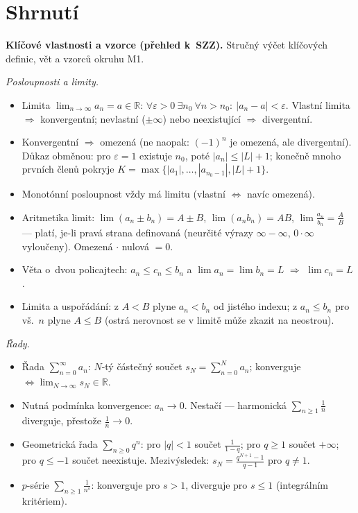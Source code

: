 \documentclass[11pt,a4paper]{article}
\begin{document}
\section*{Shrnutí}

\begin{poznamka}
\textbf{Klíčové vlastnosti a vzorce (přehled k~SZZ).} Stručný výčet klíčových definic, vět a vzorců okruhu M1.

\smallskip
\emph{Posloupnosti a limity.}
\begin{itemize}
  \item Limita $\lim_{n\to\infty}a_n=a\in\mathbb{R}$: $\forall\varepsilon>0\ \exists n_0\ \forall n>n_0:\ |a_n-a|<\varepsilon$. Vlastní limita $\Rightarrow$ konvergentní; nevlastní ($\pm\infty$) nebo neexistující $\Rightarrow$ divergentní.
  \item Konvergentní $\Rightarrow$ omezená (ne naopak: $(-1)^n$ je omezená, ale divergentní). Důkaz obměnou: pro $\varepsilon=1$ existuje $n_0$, poté $|a_n|\le|L|+1$; konečně mnoho prvních členů pokryje $K=\max\{|a_1|,\dots,|a_{n_0-1}|,|L|+1\}$.
  \item Monotónní posloupnost vždy má limitu (vlastní $\iff$ navíc omezená).
  \item Aritmetika limit: $\lim(a_n\pm b_n)=A\pm B$, $\lim(a_n b_n)=AB$, $\lim\tfrac{a_n}{b_n}=\tfrac AB$ --- platí, je-li pravá strana definovaná (neurčité výrazy $\infty-\infty$, $0\cdot\infty$ vyloučeny). Omezená $\cdot$ nulová $= 0$.
  \item Věta o~dvou policajtech: $a_n\le c_n\le b_n$ a $\lim a_n=\lim b_n=L$ $\Rightarrow$ $\lim c_n=L$.
  \item Limita a uspořádání: z $A<B$ plyne $a_n<b_n$ od jistého indexu; z $a_n\le b_n$ pro vš.\ $n$ plyne $A\le B$ (ostrá nerovnost se v limitě může zkazit na neostrou).
\end{itemize}

\smallskip
\emph{Řady.}
\begin{itemize}
  \item Řada $\sum_{n=0}^\infty a_n$: $N$-tý částečný součet $s_N=\sum_{n=0}^N a_n$; konverguje $\iff\lim_{N\to\infty}s_N\in\mathbb{R}$.
  \item Nutná podmínka konvergence: $a_n\to0$. Nestačí --- harmonická $\sum_{n\ge1}\tfrac1n$ diverguje, přestože $\tfrac1n\to0$.
  \item Geometrická řada $\sum_{n\ge0}q^n$: pro $|q|<1$ součet $\tfrac{1}{1-q}$; pro $q\ge1$ součet $+\infty$; pro $q\le-1$ součet neexistuje. Mezivýsledek: $s_N=\tfrac{q^{N+1}-1}{q-1}$ pro $q\neq1$.
  \item $p$-série $\sum_{n\ge1}\tfrac{1}{n^s}$: konverguje pro $s>1$, diverguje pro $s\le1$ (integrálním kritériem).
\end{itemize}


\end{poznamka}
\end{document}
